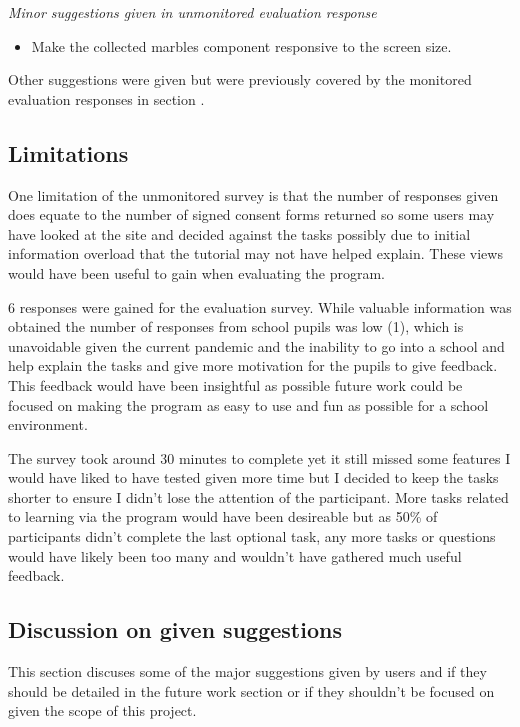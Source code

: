 \documentclass{l4proj}
\begin{document}
\emph{Minor suggestions given in unmonitored evaluation response}
\begin{itemize}
    \item Make the collected marbles component responsive to the screen size.
\end{itemize}

Other suggestions were given but were previously covered by the monitored evaluation responses in section .

\subsection{Limitations}
One limitation of the unmonitored survey is that the number of responses given does equate to the number of signed consent forms returned so some users may have looked at the site and decided against the tasks possibly due to initial information overload that the tutorial may not have helped explain. These views would have been useful to gain when evaluating the program.

6 responses were gained for the evaluation survey. While valuable information was obtained the number of responses from school pupils was low (1), which is unavoidable given the current pandemic and the inability to go into a school and help explain the tasks and give more motivation for the pupils to give feedback. This feedback would have been insightful as possible future work could be focused on making the program as easy to use and fun as possible for a school environment. 

The survey took around 30 minutes to complete yet it still missed some features I would have liked to have tested given more time but I decided to keep the tasks shorter to ensure I didn't lose the attention of the participant. More tasks related to learning via the program would have been desireable but as 50\% of participants didn't complete the last optional task, any more tasks or questions would have likely been too many and wouldn't have gathered much useful feedback.

\subsection{Discussion on given suggestions}
This section discuses some of the major suggestions given by users and if they should be detailed in the future work section or if they shouldn't be focused on given the scope of this project.
\end{document}
